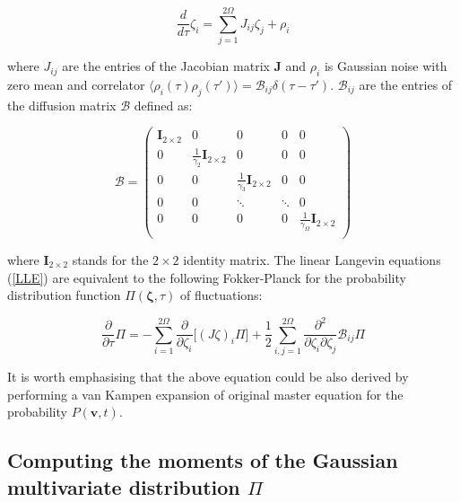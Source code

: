 \documentclass[showpacs,prl,superscriptaddress,nofootinbib, twocolumn]{revtex4}
\begin{document}
\begin{equation}
\label{LLE}
\frac{d}{d \tau} \zeta_i = \sum_{j=1}^{2 \Omega} J_{ij} \zeta_j + \rho_i
\end{equation}
 
 where $J_{ij}$ are the entries of the Jacobian matrix ${\boldsymbol J}$ and  $\rho_i$ is Gaussian noise with zero mean and correlator  
 $\langle \rho_i (\tau) \rho_j (\tau') \rangle = {\mathcal B_{ij}} \delta (\tau-\tau')$.  ${\mathcal B_{ij}}$ are the entries of the diffusion matrix ${\boldsymbol {\mathcal B}}$ defined as:
 
  \[
{\boldsymbol {\mathcal B}}=
\begin{pmatrix}
{\boldsymbol I}_{2\times2} & 0& 0 & 0 & 0  \\
0 & \frac{1}{\gamma_2}{\boldsymbol I}_{2\times2}  & 0& 0 & 0  \\
0 & 0 & \frac{1}{\gamma_3}{\boldsymbol I}_{2\times2} & 0 & 0   \\
0 & 0 & \ddots & \ddots & 0 \\
0 & 0 & 0 & 0 &  \frac{1}{\gamma_\Omega}{\boldsymbol I}_{2\times2} \\
\end{pmatrix}
\]

where ${\boldsymbol I}_{2\times2}$ stands for the $2 \times 2$ identity matrix.  The linear Langevin equations (\ref{LLE}) are equivalent to the following Fokker-Planck for the probability distribution
function $\Pi({\boldsymbol \zeta},\tau)$ of fluctuations:

\begin{equation}\label{eq:Fokker_Planck_with_different_volumes}
\frac{\partial}{\partial\tau}\Pi=-\sum_{i=1}^{2\Omega} \frac{\partial}{\partial\zeta_i}\big[(J\zeta)_i\Pi \big]+\frac{1}{2}\sum_{i,j=1}^{2\Omega}\frac{\partial^2}{\partial\zeta_i\partial\zeta_j}{\mathcal B}_{ij}\Pi
\end{equation}

It is worth emphasising that the above equation could be also derived by performing a van Kampen expansion of original master equation for the probability $P({\boldsymbol v},t)$.




\subsection{Computing the moments of the Gaussian multivariate distribution $\Pi$}
\end{document}
